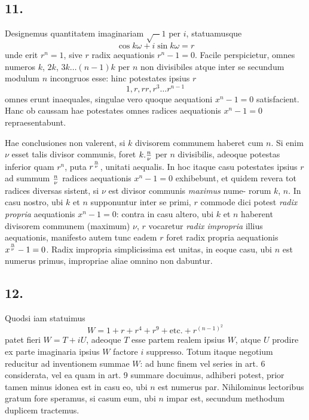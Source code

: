 \documentclass[twoside,12pt, showframe]{memoir}
\let\oldfrac\frac
\def\frac#1#2{\mathchoice{\tfrac{#1}{#2}}{\oldfrac{#1}{#2}}{\genfrac{}{}{}{2}{#1}{#2\mathstrut}}{\genfrac{}{}{}{3}{#1}{#2\mathstrut}}}
\begin{document}
\subsection*{11.}
 
Designemus quantitatem imaginariam \(\surd-1\) per \(i\), statuamusque
\[\cos k \omega+i \sin k \omega=r\]
unde erit \(r^{n}=1\), sive \(r\) radix aequationis \(r^{n}-1=0\). Facile perspicietur, omnes numeros \(k\), \(2 k\), \(3 k \ldots(n-1) k\) per \(n\) non divisibiles atque inter se secundum modulum \(n\) incongruos esse: hinc potestates ipsius \(r\)
\[1, r, r r, r^{3} \ldots r^{n-1}\]
omnes erunt inaequales, singulae vero quoque aequationi \(x^{n}-1=0\) satisfacient. Hanc ob caussam hae potestates omnes radices aequationis \(x^{n}-1=0\) repraesentabunt.

Hae conclusiones non valerent, si \(k\) divisorem communem haberet cum \(n\). Si enim \(\nu\) esset talis divisor communis, foret \(k . \frac{n}{\nu}\) per \(n\) divisibilis, adeoque potestas inferior quam \(r^{n}\), puta \(r^{\frac{n}{\nu}}\), unitati aequalis. In hoc itaque casu potestates ipsius \(r\) ad summum \(\frac{n}{\nu}\) radices aequationis \(x^{n}-1=0\) exhibebunt, et quidem revera tot radices diversas sistent, si \(\nu\) est divisor communis \textit{maximus} nume-\clearpage\noindent%
rorum \(k\), \(n\). In casu nostro, ubi \(k\) et \(n\) supponuntur inter se primi, \(r\) commode dici potest \textit{radix propria} aequationis \(x^{n}-1=0\): contra in casu altero, ubi \(k\) et \(n\) haberent divisorem communem (maximum) \(\nu\), \(r\) vocaretur \textit{radix impropria} illius aequationis, manifesto autem tunc eadem \(r\) foret radix propria aequationis \(x^{\frac{n}{\nu}}-1=0\). Radix impropria simplicissima est unitas, in eoque casu, ubi \(n\) est numerus primus, impropriae aliae omnino non dabuntur.

\subsection*{12.}
 
Quodsi iam statuimus
\[W=1+r+r^{4}+r^{9}+\text{etc.}+r^{(n-1)^{2}}\]
patet fieri \(W=T+i U\), adeoque \(T\) esse partem realem ipsius \(W\), atque \(U\) prodire ex parte imaginaria ipsius \(W\) factore \(i\) suppresso. Totum itaque negotium reducitur ad inventionem summae \(W\): ad hunc finem vel series in art. 6 considerata, vel ea quam in art. 9 summare docuimus, adhiberi potest, prior tamen minus idonea est in casu eo, ubi \(n\) est numerus par. Nihilominus lectoribus gratum fore speramus, si casum eum, ubi \(n\) impar est, secundum methodum duplicem tractemus.
\end{document}
